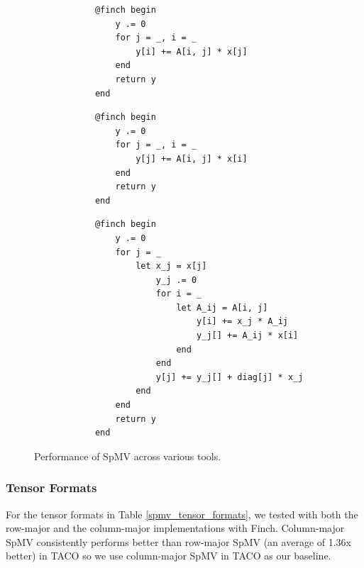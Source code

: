 \begin{figure}
    \begin{minipage}[t]{0.315\textwidth}
        \vspace{0pt} %
        \begin{verbatim}
            @finch begin
                y .= 0
                for j = _, i = _
                    y[i] += A[i, j] * x[j]
                end
                return y
            end
        \end{verbatim}
    \end{minipage}%
    \begin{minipage}[t]{0.315\textwidth}
        \vspace{0pt} %
        \begin{verbatim}
            @finch begin
                y .= 0
                for j = _, i = _
                    y[j] += A[i, j] * x[i]
                end
                return y
            end
        \end{verbatim}
    \end{minipage}
    \begin{minipage}[t]{0.36\textwidth}
        \vspace{0pt} %
        \begin{verbatim}
            @finch begin
                y .= 0
                for j = _
                    let x_j = x[j]
                        y_j .= 0
                        for i = _
                            let A_ij = A[i, j]
                                y[i] += x_j * A_ij
                                y_j[] += A_ij * x[i]
                            end
                        end
                        y[j] += y_j[] + diag[j] * x_j
                    end
                end
                return y
            end
        \end{verbatim}
    \end{minipage}
    \caption{Performance of SpMV across various tools.}
\end{figure}

\subsubsection{Tensor Formats}
For the tensor formats in Table \ref{spmv_tensor_formats}, we tested with both the row-major and the column-major implementations with Finch. Column-major SpMV consistently performs better than row-major SpMV (an average of 1.36x better) in TACO so we use column-major SpMV in TACO as our baseline.

